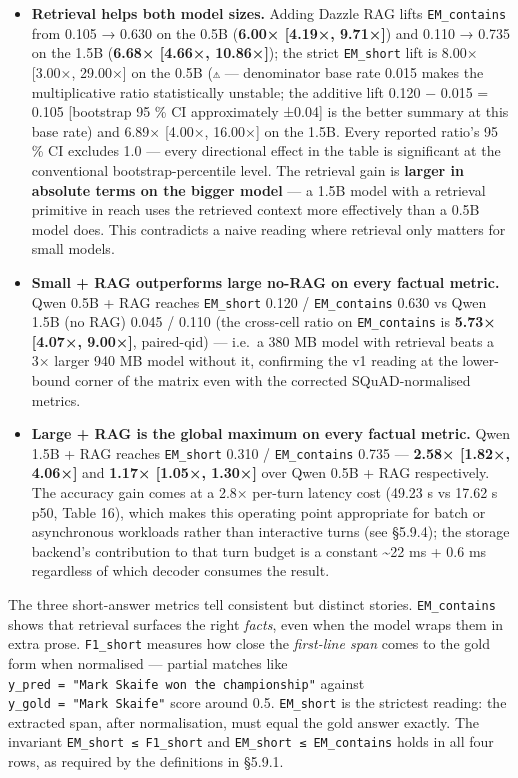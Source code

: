 \begin{itemize}
\tightlist
\item
  \textbf{Retrieval helps both model sizes.} Adding Dazzle RAG lifts
  \texttt{EM\_contains} from 0.105 → 0.630 on the 0.5B (\textbf{6.00× {[}4.19×,
  9.71×{]}}) and 0.110 → 0.735 on the 1.5B (\textbf{6.68× {[}4.66×, 10.86×{]}});
  the strict \texttt{EM\_short} lift is 8.00× {[}3.00×, 29.00×{]} on the 0.5B
  (\texttt{⚠} --- denominator base rate 0.015 makes the multiplicative ratio
  statistically unstable; the additive lift 0.120 − 0.015 = 0.105 {[}bootstrap
  95 \% CI approximately ±0.04{]} is the better summary at this base rate) and
  6.89× {[}4.00×, 16.00×{]} on the 1.5B. Every reported ratio's 95 \% CI
  excludes 1.0 --- every directional effect in the table is significant at the
  conventional bootstrap-percentile level. The retrieval gain is \textbf{larger
  in absolute terms on the bigger model} --- a 1.5B model with a retrieval
  primitive in reach uses the retrieved context more effectively than a 0.5B
  model does. This contradicts a naive reading where retrieval only matters for
  small models.
\item
  \textbf{Small + RAG outperforms large no-RAG on every factual metric.} Qwen
  0.5B + RAG reaches \texttt{EM\_short} 0.120 / \texttt{EM\_contains} 0.630 vs
  Qwen 1.5B (no RAG) 0.045 / 0.110 (the cross-cell ratio on
  \texttt{EM\_contains} is \textbf{5.73× {[}4.07×, 9.00×{]}}, paired-qid) ---
  i.e.~a 380 MB model with retrieval beats a 3× larger 940 MB model without it,
  confirming the v1 reading at the lower-bound corner of the matrix even with
  the corrected SQuAD-normalised metrics.
\item
  \textbf{Large + RAG is the global maximum on every factual metric.} Qwen 1.5B
  + RAG reaches \texttt{EM\_short} 0.310 / \texttt{EM\_contains} 0.735 ---
  \textbf{2.58× {[}1.82×, 4.06×{]}} and \textbf{1.17× {[}1.05×, 1.30×{]}} over
  Qwen 0.5B + RAG respectively. The accuracy gain comes at a 2.8× per-turn
  latency cost (49.23 s vs 17.62 s p50, Table 16), which makes this operating
  point appropriate for batch or asynchronous workloads rather than interactive
  turns (see §5.9.4); the storage backend's contribution to that turn budget is
  a constant \textasciitilde22 ms + 0.6 ms regardless of which decoder consumes
  the result.
\end{itemize}

The three short-answer metrics tell consistent but distinct stories.
\texttt{EM\_contains} shows that retrieval surfaces the right \emph{facts}, even
when the model wraps them in extra prose. \texttt{F1\_short} measures how close
the \emph{first-line span} comes to the gold form when normalised --- partial
matches like \texttt{y\_pred\ =\ "Mark\ Skaife\ won\ the\ championship"} against
\texttt{y\_gold\ =\ "Mark\ Skaife"} score around 0.5. \texttt{EM\_short} is the
strictest reading: the extracted span, after normalisation, must equal the gold
answer exactly. The invariant \texttt{EM\_short\ ≤\ F1\_short} and
\texttt{EM\_short\ ≤\ EM\_contains} holds in all four rows, as required by the
definitions in §5.9.1.


